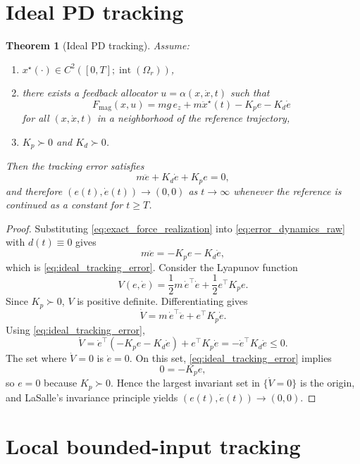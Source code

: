 \documentclass[11pt]{article}
\newtheorem{theorem}{Theorem}
\theoremstyle{definition}
\begin{document}
\section{Ideal PD tracking}

\begin{theorem}[Ideal PD tracking]
Assume:
\begin{enumerate}[label=(\roman*), leftmargin=1.5em]
  \item $x^\star(\cdot)\in C^2([0,T];\operatorname{int}(\Omega_r))$,
  \item there exists a feedback allocator $u=\alpha(x,\dot x,t)$ such that
  \begin{equation}
  F_{\mathrm{mag}}(x,u) = mg\,e_z + m\ddot x^\star(t) - K_p e - K_d \dot e
  \label{eq:exact_force_realization}
  \end{equation}
  for all $(x,\dot x,t)$ in a neighborhood of the reference trajectory,
  \item $K_p\succ0$ and $K_d\succ0$.
\end{enumerate}
Then the tracking error satisfies
\begin{equation}
 m\ddot e + K_d\dot e + K_p e = 0,
 \label{eq:ideal_tracking_error}
\end{equation}
and therefore $(e(t),\dot e(t))\to(0,0)$ as $t\to\infty$ whenever the reference is continued as a constant for $t\ge T$.
\end{theorem}

\begin{proof}
Substituting \eqref{eq:exact_force_realization} into \eqref{eq:error_dynamics_raw} with $d(t)\equiv 0$ gives
\[
 m\ddot e = -K_p e - K_d\dot e,
\]
which is \eqref{eq:ideal_tracking_error}. Consider the Lyapunov function
\[
 V(e,\dot e)=\frac12 m\,\dot e^\top\dot e + \frac12 e^\top K_p e.
\]
Since $K_p\succ0$, $V$ is positive definite. Differentiating gives
\[
 \dot V = m\,\dot e^\top\ddot e + e^\top K_p\dot e.
\]
Using \eqref{eq:ideal_tracking_error},
\[
 \dot V = \dot e^\top(-K_p e - K_d\dot e)+e^\top K_p\dot e
 = -\dot e^\top K_d\dot e\le0.
\]
The set where $\dot V=0$ is $\dot e=0$. On this set, \eqref{eq:ideal_tracking_error} implies
\[
 0 = -K_p e,
\]
so $e=0$ because $K_p\succ0$. Hence the largest invariant set in $\{\dot V=0\}$ is the origin, and LaSalle's invariance principle yields $(e(t),\dot e(t))\to(0,0)$.
\end{proof}

\section{Local bounded-input tracking}
\end{document}
